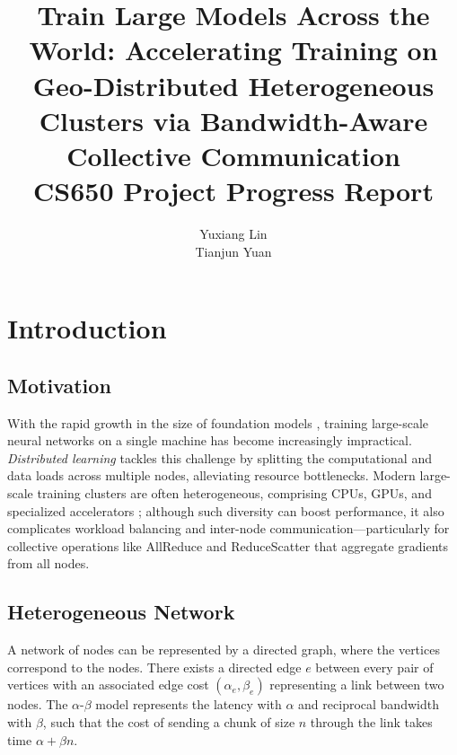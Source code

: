 \documentclass{article}
\title{
    \Large Train Large Models Across the World: Accelerating Training on Geo-Distributed Heterogeneous Clusters
    via Bandwidth-Aware Collective Communication\\[1em]
    \normalsize CS650 Project Progress Report
}
\author{%
  Yuxiang Lin \\
  \And
  Tianjun Yuan \\
}
\begin{document}
\maketitle




\section{Introduction}

\subsection{Motivation}

With the rapid growth in the size of foundation models \cite{achiam2023gpt, touvron2023llama}, training large-scale neural networks on a single machine has become increasingly impractical. \emph{Distributed learning} \cite{chen2021distributed} tackles this challenge by splitting the computational and data loads across multiple nodes, alleviating resource bottlenecks. Modern large-scale training clusters are often heterogeneous, comprising CPUs, GPUs, and specialized accelerators \cite{duan2024efficient}; although such diversity can boost performance, it also complicates workload balancing and inter-node communication—particularly for collective operations like AllReduce and ReduceScatter \cite{won2024tacos, cho2019blueconnect} that aggregate gradients from all nodes. 

\subsection{Heterogeneous Network}

A network of nodes can be represented by a directed graph, where the vertices correspond to the nodes. There exists a directed edge $e$ between every pair of vertices with an associated edge cost $(\alpha_e, \beta_e)$ representing a link between two nodes. The $\alpha$-$\beta$ model \cite{hockney1994communication} represents the latency with $\alpha$ and reciprocal bandwidth with $\beta$, such that the cost of sending a chunk of size $n$ through the link takes time $\alpha + \beta n$.
\end{document}
